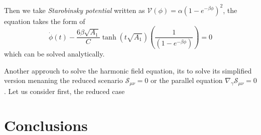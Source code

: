\documentclass[10pt,a4paper]{article}
\begin{document}
Then we take \textit{Starobinsky potential} written as $\mathcal{V}(\phi) =  \alpha \left(1 - e^{-\beta\phi}\right)^2$, the equation takes
the form of
\begin{equation}
  \dot{\phi}(t) - \frac{6\beta\sqrt{A_1}}{C}\tanh\left(t\sqrt{A_1}\right)\left(\frac{1}{\left(1 - e^{-\beta\phi}\right)}\right) = 0
\end{equation}
which can be solved analytically.

Another approuch to solve the harmonic field equation, its to solve its simplified version menaning the reduced scenario $\mathcal{S}_{\mu\nu} = 0$
or the parallel equation $\nabla_\gamma\mathcal{S}_{\mu\nu} = 0$. Let us consider first, the reduced case


\section{Conclusions}
\end{document}
